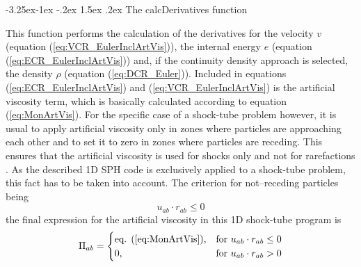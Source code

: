 \documentclass[11pt,a4paper,twoside]{report}
\makeatletter
\renewcommand\paragraph{\@startsection{paragraph}{4}{\z@}%
  {-3.25ex\@plus -1ex \@minus -.2ex}%
  {1.5ex \@plus .2ex}%
  {\normalfont\normalsize\bfseries}}
\makeatother
\begin{document}
\paragraph{The calcDerivatives function}

This function performs the calculation of the derivatives for the velocity $v$ (equation (\ref{eq:VCR_EulerInclArtVis})), the internal energy $e$ (equation (\ref{eq:ECR_EulerInclArtVis})) and, if the continuity density approach is selected, the density $\rho$ (equation (\ref{eq:DCR_Euler})). Included in equations (\ref{eq:ECR_EulerInclArtVis}) and (\ref{eq:VCR_EulerInclArtVis}) is the artificial viscosity term, which is basically calculated according to equation (\ref{eq:MonArtVis}). For the specific case of a shock-tube problem however, it is usual to apply artificial viscosity only in zones where particles are approaching each other and to set it to zero in zones where particles are receding. This ensures that the artificial viscosity is used for shocks only and not for rarefactions \cite{Monaghan2005}. As the described 1D SPH code is exclusively applied to a shock-tube problem, this fact has to be taken into account. 
The criterion for not--receding particles being 
\begin{equation}
 u_{ab}\cdot r_{ab}\leq 0
\end{equation}
the final expression for the artificial viscosity in this 1D shock-tube program is
\begin{equation}
\Pi_{ab}=\begin{cases}
\text{eq. (\ref{eq:MonArtVis})}, &  \text{for~} u_{ab}\cdot r_{ab}\leq 0 \\
0,&  \text{for~} u_{ab}\cdot r_{ab}> 0 
\end{cases}
\end{equation}
\end{document}
